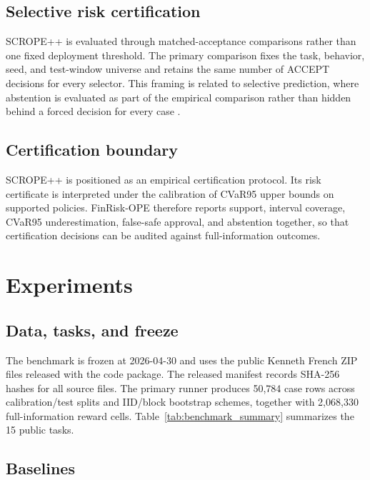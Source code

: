 \documentclass[conference]{IEEEtran}
\begin{document}
\subsection{Selective risk certification}

SCROPE++ is evaluated through matched-acceptance comparisons rather than one fixed deployment threshold. The primary comparison fixes the task, behavior, seed, and test-window universe and retains the same number of ACCEPT decisions for every selector. This framing is related to selective prediction, where abstention is evaluated as part of the empirical comparison rather than hidden behind a forced decision for every case \cite{GeifmanE17}.

\subsection{Certification boundary}

SCROPE++ is positioned as an empirical certification protocol. Its risk certificate is interpreted under the calibration of CVaR95 upper bounds on supported policies. FinRisk-OPE therefore reports support, interval coverage, CVaR95 underestimation, false-safe approval, and abstention together, so that certification decisions can be audited against full-information outcomes.

\section{Experiments}

\subsection{Data, tasks, and freeze}

The benchmark is frozen at 2026-04-30 and uses the public Kenneth French ZIP files released with the code package. The released manifest records SHA-256 hashes for all source files. The primary runner produces 50,784 case rows across calibration/test splits and IID/block bootstrap schemes, together with 2,068,330 full-information reward cells. Table~\ref{tab:benchmark_summary} summarizes the 15 public tasks.



\subsection{Baselines}
\end{document}
